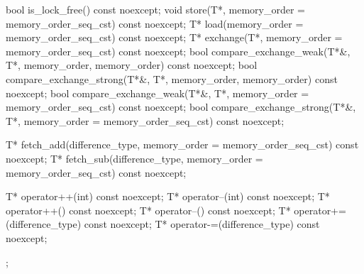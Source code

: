 \begin{codeblock}
{{    bool is_lock_free() const noexcept;
    void store(T*, memory_order = memory_order_seq_cst) const noexcept;
    T* load(memory_order = memory_order_seq_cst) const noexcept;
    T* exchange(T*, memory_order = memory_order_seq_cst) const noexcept;
    bool compare_exchange_weak(T*&, T*,
                               memory_order, memory_order) const noexcept;
    bool compare_exchange_strong(T*&, T*,
                                 memory_order, memory_order) const noexcept;
    bool compare_exchange_weak(T*&, T*,
                               memory_order = memory_order_seq_cst) const noexcept;
    bool compare_exchange_strong(T*&, T*,
                                 memory_order = memory_order_seq_cst) const noexcept;

    T* fetch_add(difference_type, memory_order = memory_order_seq_cst) const noexcept;
    T* fetch_sub(difference_type, memory_order = memory_order_seq_cst) const noexcept;

    T* operator++(int) const noexcept;
    T* operator--(int) const noexcept;
    T* operator++() const noexcept;
    T* operator--() const noexcept;
    T* operator+=(difference_type) const noexcept;
    T* operator-=(difference_type) const noexcept;
  };
}
\end{codeblock}

